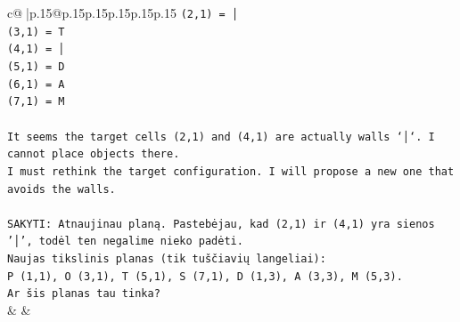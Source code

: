 \documentclass{article}
\begin{document}
{\begin{supertabular}{c@{$\;$}|p{.15\linewidth}@{}p{.15\linewidth}p{.15\linewidth}p{.15\linewidth}p{.15\linewidth}p{.15\linewidth}}
{{{\texttt{(2,1) = │} \\
\texttt{(3,1) = T} \\
\texttt{(4,1) = │} \\
\texttt{(5,1) = D} \\
\texttt{(6,1) = A} \\
\texttt{(7,1) = M} \\
\\ 
\texttt{It seems the target cells (2,1) and (4,1) are actually walls `│`. I cannot place objects there.} \\
\texttt{I must rethink the target configuration. I will propose a new one that avoids the walls.} \\
\\ 
\texttt{SAKYTI: Atnaujinau planą. Pastebėjau, kad (2,1) ir (4,1) yra sienos '│', todėl ten negalime nieko padėti.} \\
\texttt{Naujas tikslinis planas (tik tuščiavių langeliai):} \\
\texttt{P (1,1), O (3,1), T (5,1), S (7,1), D (1,3), A (3,3), M (5,3).} \\
\texttt{Ar šis planas tau tinka?} \\
            }
        }
    }
    & & \\ \\


\end{supertabular}}
\end{document}
